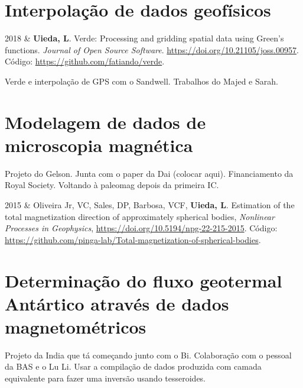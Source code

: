 \documentclass[10pt,a4paper,oneside]{book}
\newcommand{\Me}{\textbf{Uieda, L}}
\newcommand{\Val}{Barbosa, VCF}
\newcommand{\Bi}{Oliveira Jr, VC}
\newcommand{\Dai}{Sales, DP}
\newcommand{\DOI}[1]{\url{https://doi.org/#1}}
\newcommand{\GitHub}[1]{\faGithub{} Código: \url{https://github.com/#1}}
\begin{document}
\section{Interpolação de dados geofísicos}

\begin{subsummarybox}[frametitle=\faFilePdf{}\quad Artigos publicados]
  \begin{paperlist}
    2018 &
      \Me. Verde: Processing and gridding spatial data using Green's functions.
      \emph{Journal of Open Source Software}.
      \DOI{10.21105/joss.00957}.
      \GitHub{fatiando/verde}.
  \end{paperlist}
\end{subsummarybox}
\begin{subsummarybox}[frametitle=\faInfoCircle{}\quad Apresentações]
  \begin{paperlist}
  \end{paperlist}
\end{subsummarybox}

Verde e interpolação de GPS com o Sandwell.
Trabalhos do Majed e Sarah.

\section{Modelagem de dados de microscopia magnética}

Projeto do Gelson.
Junta com o paper da Dai (colocar aqui).
Financiamento da Royal Society.
Voltando à paleomag depois da primeira IC.

\begin{subsummarybox}[frametitle=\faFilePdf{}\quad Artigos publicados]
  \begin{paperlist}
    2015 &
      \Bi, \Dai, \Val, \Me.
      Estimation of the total magnetization direction of approximately spherical
      bodies,
      \emph{Nonlinear Processes in Geophysics},
      \DOI{10.5194/npg-22-215-2015}.
      \GitHub{pinga-lab/Total-magnetization-of-spherical-bodies}.
  \end{paperlist}
\end{subsummarybox}


\section{Determinação do fluxo geotermal Antártico através de dados magnetométricos}

Projeto da India que tá começando junto com o Bi.
Colaboração com o pessoal da BAS e o Lu Li.
Usar a compilação de dados produzida com camada equivalente para fazer uma
inversão usando tesseroides.
\end{document}
